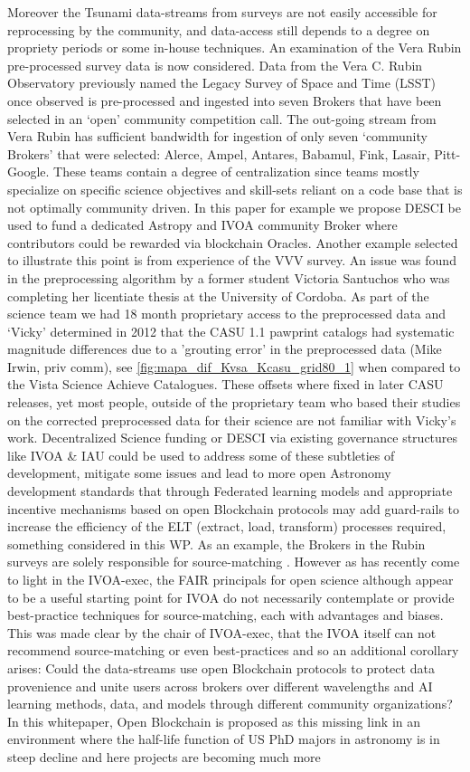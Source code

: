 \documentclass[final,5p,times,twocolumn,authoryear]{elsarticle}
\begin{document}
Moreover the Tsunami data-streams from surveys are not easily accessible for reprocessing by the community, and data-access still depends to a degree on propriety periods or some in-house techniques. An examination of the Vera Rubin pre-processed survey data is now considered. Data from the Vera C. Rubin Observatory previously named the Legacy Survey of Space and Time (LSST) once observed is pre-processed and ingested into seven Brokers that have been selected in an `open' community competition call.  The out-going stream from Vera Rubin has sufficient bandwidth for ingestion of only seven `community Brokers' that were selected: Alerce, Ampel, Antares, Babamul, Fink, Lasair, Pitt-Google. These teams contain a degree of centralization since teams mostly specialize on specific science objectives and skill-sets reliant on a code base that is not optimally community driven. In this paper for example we propose DESCI be used to fund a dedicated Astropy and IVOA community Broker where contributors could be rewarded via blockchain Oracles. Another example selected to illustrate this point is from experience of the VVV survey. An issue was found in the preprocessing algorithm by a former student Victoria Santuchos who was completing her licentiate thesis at the University of Cordoba. As part of the science team we had 18 month proprietary access to the preprocessed data and `Vicky' determined in 2012 that the CASU 1.1 pawprint catalogs had systematic magnitude differences due to a 'grouting error' in the preprocessed data (Mike Irwin, priv comm), see \ref{fig:mapa_dif_Kvsa_Kcasu_grid80_1} when compared to the Vista Science Achieve Catalogues. These offsets where fixed in later CASU releases, yet most people, outside of the proprietary team who based their studies on the corrected preprocessed data for their science are not familiar with Vicky's work. Decentralized Science funding or DESCI via existing governance structures like IVOA \& IAU could be used to address some of these subtleties of development, mitigate some issues and lead to more open Astronomy development standards that through Federated learning models and appropriate incentive mechanisms based on open Blockchain protocols may add guard-rails to increase the efficiency of the  ELT (extract, load, transform) processes required, something considered in this WP. As an example, the Brokers in the Rubin surveys are solely responsible for source-matching \citep{bellm19}. However as has recently come to light in the IVOA-exec, the FAIR principals for open science although appear to be a useful starting point for IVOA do not necessarily contemplate or provide best-practice techniques for source-matching, each with advantages and biases. This was made clear by the chair of IVOA-exec, that the IVOA itself can not recommend source-matching or even best-practices and so an additional corollary arises: Could the data-streams use open Blockchain protocols to protect data provenience and unite users across brokers over different wavelengths and AI learning methods, data, and models through different community organizations? In this whitepaper, Open Blockchain is proposed as this missing link in an environment where the half-life function of US PhD majors in astronomy is in steep decline and here projects are becoming much more 
\end{document}
